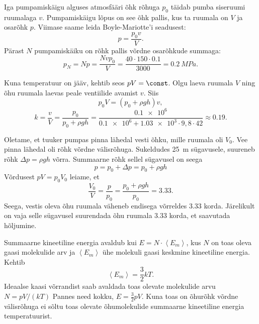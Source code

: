 \documentclass[10pt]{article}
\begin{document}
{
\solu
Iga pumpamiskäigu alguses atmosfääri õhk rõhuga $p_0$ täidab pumba siseruumi ruumalaga $v$. Pumpamiskäigu lõpus on see õhk pallis, kus ta ruumala on $V$ ja osarõhk $p$. Viimase saame leida Boyle-Mariotte’i seadusest:
\[
p = \frac{p_0v}{V}.
\]
Pärast $N$ pumpamiskäiku on rõhk pallis võrdne osarõhkude summaga:
\[
p_{N}=N p=\frac{N v p_{0}}{V}=\frac{40 \cdot 150 \cdot \num{0,1}}{3000}=\SI{0,2}{MPa}.
\]
\probend
\bigskip


\solu
Kuna temperatuur on jääv, kehtib seos $pV = \const$. Olgu laeva ruumala $V$ ning õhu ruumala laevas peale ventiilide avamist $v$. Siis
\[
p_{0} V=\left(p_{0}+\rho g h\right) v,
\]
\[
k=\frac{v}{V}=\frac{p_{0}}{p_{0}+\rho g h}=\frac{\num{0,1e6}}{\num{0,1e6}+\num{1,03e3} \cdot 9,8 \cdot 42} \approx \num{0,19}.
\]
\probend
\bigskip


\solu
Oletame, et tuuker pumpas pinna lähedal vesti õhku, mille ruumala oli $V_0$. Vee pinna lähedal oli rõhk võrdne välisrõhuga. Sukeldudes \SI{25}{m} sügavusele, suureneb rõhk $\Delta p = \rho gh$ võrra. Summaarne rõhk sellel sügavusel on seega
\[
p=p_{0}+\Delta p=p_{0}+\rho g h
\]
Võrdusest $pV=p_0V_0$ leiame, et
\[
\frac{V_{0}}{V}=\frac{p}{p_{0}}=\frac{p_{0}+\rho g h}{p_{0}}=\num{3,33}.
\]
Seega, vestis oleva õhu ruumala väheneb endisega võrreldes \num{3,33} korda. Järelikult on vaja selle sügavusel suurendada õhu ruumala \num{3,33} korda, et saavutada hõljumine.
\probend
\bigskip


\solu
Summaarne kineetiline energia avaldub kui $E = N \cdot \left\langle E_m\right\rangle$, kus $N$ on toas oleva gaasi molekulide arv ja $\left\langle E_m\right\rangle$ ühe molekuli gaasi keskmine kineetiline energia. Kehtib
\[
\left\langle E_{m}\right\rangle=\frac{3}{2} k T.
\]
Ideaalse kaasi võrrandist saab avaldada toas olevate molekulide arvu $N = pV /(kT)$ Pannes need kokku, $E = \frac{3}{2} pV$. Kuna toas on õhurõhk võrdne välisrõhuga ei sõltu toas olevate õhumolekulide summaarne kineetiline energia temperatuurist.
\probend
\bigskip

}
\end{document}
